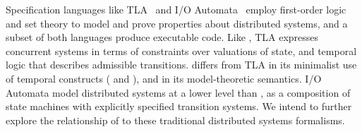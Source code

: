 \begin{comment}
\jmh{This whole paragraph makes me very nervous.  I'm not sure how what we're doing exactly relates to serializability, much less linearizability about which I know much less.  Do we really need to bring this up?}
Our attempts to model and verify properties specific to distributed systems like 
confluence and consistency of replicated state are similar in spirit to the database literature
describing serializable transactions~\cite{serializability}.  Similarly, the programming languages
community has formalized the notion of linearizable~\cite{linearizability} operations on
concurrent data structures.  Abstractly, serializability differs from linearizability in that the
former is a global property while the latter is local to individual structures and operations;
our model-theoretic analyses encompass both global (e.g., confluence) and local (e.g., downstream 
confluence) properties, but differ from both traditions in that they are applied at a higher
level, based upon the scope and boundaries of logical monotonicity rather than the intersection of read and write sets for shared objects \paa{ugh, rewrite me please}.


\jmh{How about a short paragraph on Vogel's alternative definitions of EC, and how they represent different constraints in the spirit of Section 4?  Leave it to future work to provably ensure these constraints.}

\jmh{How about an admission that while our formalism is cool and enabled us to do new stuff, it would be nice to explore its relationship to traditional distributed systems formalisms like IOA and TLA+.}
\end{comment}

Specification languages like TLA~\cite{tla} and I/O Automata~\cite{ioa} employ
first-order logic and set theory to model and prove properties about distributed
systems, and a subset of both languages produce executable code.  Like \lang,
TLA expresses concurrent systems in terms of constraints over valuations of
state, and temporal logic that describes admissible transitions.  \lang differs
from TLA in its minimalist use of temporal constructs ( and
), and in its model-theoretic semantics.  I/O Automata model
distributed systems at a lower level than \lang, as a composition of state
machines with explicitly specified transition systems.  We intend to further
explore the relationship of \lang to these traditional distributed systems
formalisms.

